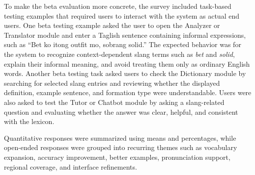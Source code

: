 To make the beta evaluation more concrete, the survey included task-based testing examples that required users to interact with the system as actual end users. One beta testing example asked the user to open the Analyzer or Translator module and enter a Taglish sentence containing informal expressions, such as ``Bet ko itong outfit mo, sobrang solid.'' The expected behavior was for the system to recognize context-dependent slang terms such as \textit{bet} and \textit{solid}, explain their informal meaning, and avoid treating them only as ordinary English words. Another beta testing task asked users to check the Dictionary module by searching for selected slang entries and reviewing whether the displayed definition, example sentence, and formation type were understandable. Users were also asked to test the Tutor or Chatbot module by asking a slang-related question and evaluating whether the answer was clear, helpful, and consistent with the lexicon.

Quantitative responses were summarized using means and percentages, while open-ended responses were grouped into recurring themes such as vocabulary expansion, accuracy improvement, better examples, pronunciation support, regional coverage, and interface refinements.
